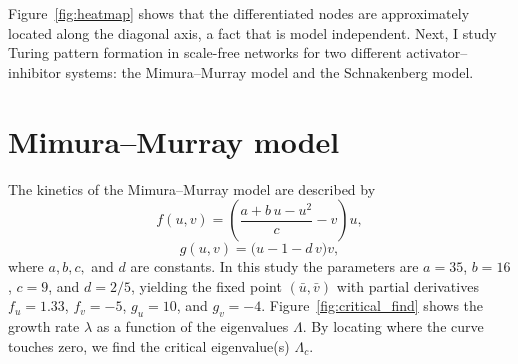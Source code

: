 Figure~\ref{fig:heatmap} shows that the differentiated nodes are approximately located along the diagonal axis, a fact that is model independent. Next, I study Turing pattern formation in scale-free networks for two different activator–inhibitor systems: the Mimura–Murray model and the Schnakenberg model.

\section{Mimura–Murray model}
The kinetics of the Mimura–Murray model are described by
\begin{equation}
    f(u,v) = \left( \frac{a + b\,u - u^{2}}{c} - v \right)u,
    \label{eq:Mimura_activator}
\end{equation}
\begin{equation}
g(u,v) = \bigl(u - 1 - d\,v\bigr)v,
\label{eq:Mimura_inhib}
\end{equation}
where \(a, b, c,\) and \(d\) are constants. In this study the parameters are \(a=35\), \(b=16\), \(c=9\), and \(d=2/5\), yielding the fixed point \((\bar{u}, \bar{v})\) with partial derivatives \(f_u=1.33\), \(f_v=-5\), \(g_u=10\), and \(g_v=-4\). Figure~\ref{fig:critical_find} shows the growth rate \(\lambda\) as a function of the eigenvalues \(\Lambda\). By locating where the curve touches zero, we find the critical eigenvalue(s) \(\Lambda_c\).

